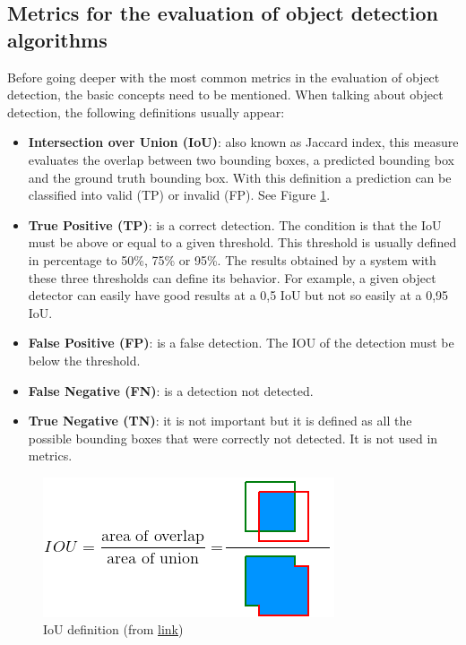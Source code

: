 \subsection{Metrics for the evaluation of object detection algorithms}
Before going deeper with the most common metrics in the evaluation of object detection, the basic concepts need to be mentioned. When talking about object detection, the following definitions usually appear:
\begin{itemize}
    \item \textbf{Intersection over Union (IoU)}: also known as Jaccard index, this measure evaluates the overlap between two bounding boxes, a predicted bounding box and the ground truth bounding box. With this definition a prediction can be classified into valid (TP) or invalid (FP). See Figure \ref{fig:iou}.
    \item \textbf{True Positive (TP)}: is a correct detection. The condition is that the IoU must be above or equal to a given threshold. This threshold is usually defined in percentage to 50\%, 75\% or 95\%. The results obtained by a system with these three thresholds can define its behavior. For example, a given object detector can easily have good results at a 0,5 IoU but not so easily at a 0,95 IoU.
    \item \textbf{False Positive (FP)}: is a false detection. The IOU of the detection must be below the threshold.
    \item \textbf{False Negative (FN)}: is a detection not detected.
    \item \textbf{True Negative (TN)}: it is not important but it is defined as all the possible bounding boxes that were correctly not detected. It is not used in metrics.
\end{itemize}
\begin{figure}[H]
\begin{center}
\includegraphics[scale=0.5]{figures/iou.png}
\caption{IoU definition (from \href{https://github.com/rafaelpadilla/Object-Detection-Metrics#intersection-over-union-iou}{link})}
\label{fig:iou}
\end{center}
\end{figure}

